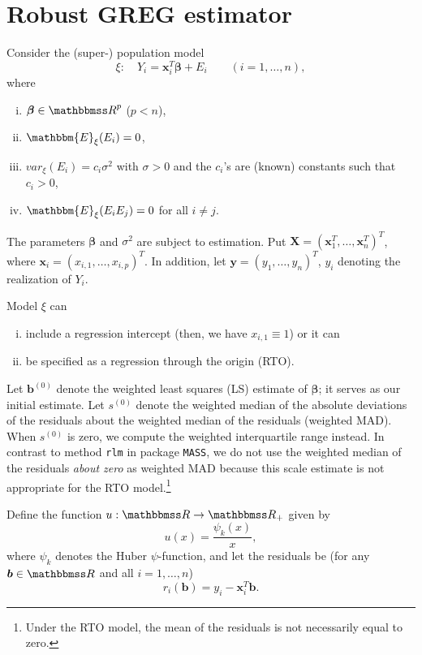 \documentclass[a4paper,11pt]{scrreprt}
\begin{document}
\chapter{Robust GREG estimator}\label{ch:greg}
Consider the (super-) population model
\begin{equation*}
   \xi: \quad Y_i = \bm x_i^T\bm \beta + E_i \qquad(i=1,\ldots, n),
\end{equation*}
\noindent where 
\begin{enumerate}[i)]
   \item $\bm \beta \in \R^p$ ($p < n$),
   \item $\mathbbm{E}_{\xi}(E_i)=0$,  
   \item $var_{\xi}(E_i) = c_i \sigma^2$ with $\sigma > 0$ and the $c_i$'s are (known) constants such that $c_i > 0$,
   \item $\mathbbm{E}_{\xi}(E_iE_j)=0$ for all $i \neq j$. 
\end{enumerate}

\noindent The parameters $\bm \beta$ and $\sigma^2$ are subject to estimation. Put $\bm X = (\bm x_1^T, \ldots, \bm x_n^T)^T$, where $\bm x_i = (x_{i,1}, \ldots, x_{i,p})^T$. In addition, let $\bm y = (y_1, \ldots, y_n)^T$, $y_i$ denoting the realization of $Y_i$. 

Model $\xi$ can 
\begin{enumerate}[i)]
   \item include a regression intercept (then, we have $x_{i,1} \equiv 1$)  or it can 
   \item be specified as a regression through the origin (RTO).  
\end{enumerate}

Let $\bm b^{(0)}$ denote the weighted least squares (LS) estimate of $\bm \beta$; it serves as our initial estimate. Let  $s^{(0)}$ denote the weighted median of the absolute deviations of the residuals about the weighted median of the residuals (weighted MAD). When $s^{(0)}$ is zero, we compute the weighted interquartile range instead. In contrast to method \texttt{rlm} in package \texttt{MASS}, we do not use the weighted median of the residuals \textit{about zero} as weighted MAD because this scale estimate is not appropriate for the RTO model.\footnote{Under the RTO model, the mean of the residuals is not necessarily equal to zero.} 

Define the function $u:\R \rightarrow \R_+$ given by 
\begin{equation*}
   u(x) = \frac{\psi_k(x)}{x},
\end{equation*}
\noindent where $\psi_k$ denotes the Huber $\psi$-function, and let the residuals be (for any $\bm b \in \R$ and all $i=1,\ldots,n$) 
\begin{equation*}
   r_i(\bm b) = y_i - \bm x_i^T \bm b.
\end{equation*}
\end{document}
